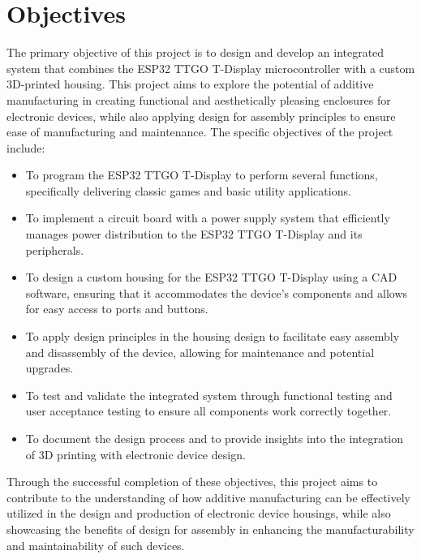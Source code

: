 \section{Objectives}

The primary objective of this project is to design and develop an integrated system that combines the ESP32 TTGO T-Display microcontroller with a custom 3D-printed housing. This project aims to explore the potential of additive manufacturing in creating functional and aesthetically pleasing enclosures for electronic devices, while also applying design for assembly principles to ensure ease of manufacturing and maintenance. The specific objectives of the project include:

\begin{itemize}
    \item To program the ESP32 TTGO T-Display to perform several functions, specifically delivering classic games and basic utility applications.
    \item To implement a circuit board with a power supply system that efficiently manages power distribution to the ESP32 TTGO T-Display and its peripherals.
    \item To design a custom housing for the ESP32 TTGO T-Display using a CAD software, ensuring that it accommodates the device's components and allows for easy access to ports and buttons.
    \item To apply design principles in the housing design to facilitate easy assembly and disassembly of the device, allowing for maintenance and potential upgrades.
    \item To test and validate the integrated system through functional testing and user acceptance testing to ensure all components work correctly together.
    \item To document the design process and to provide insights into the integration of 3D printing with electronic device design.
\end{itemize}

Through the successful completion of these objectives, this project aims to contribute to the understanding of how additive manufacturing can be effectively utilized in the design and production of electronic device housings, while also showcasing the benefits of design for assembly in enhancing the manufacturability and maintainability of such devices.